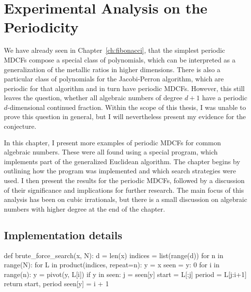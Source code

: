 \chapter{Experimental Analysis on the Periodicity}
\label{ch:implementation}

We have already seen in Chapter~\ref{ch:fibonacci},
that the simplest periodic MDCFs compose a special class of polynomials,
which can be interpreted as a generalization of the metallic ratios in higher
dimensions.
There is also a particular class of polynomials for the Jacobi-Perron algorithm,
which are periodic for that algorithm and in turn have periodic MDCFs.
However, this still leaves the question, whether all algebraic numbers of degree $d+1$
have a periodic $d$-dimensional continued fraction.
Within the scope of this thesis, I was unable to prove this question in
general, but I will nevertheless present my evidence for the conjecture.

In this chapter, I present more examples of periodic MDCFs for common algebraic numbers.
These were all found using a special program, which implements part of the generalized Euclidean algorithm.
The chapter begins by outlining how the program was implemented and which search strategies were used.
I then present the results for the periodic MDCFs, followed by a discussion of
their significance and implications for further research.
The main focus of this analysis has been on cubic irrationals,
but there is a small discussion on algebraic numbers with higher degree at the end of the chapter.

\section{Implementation details}

\begin{Python}[
    float=tbp,
    numbers=left,
    label={lst:bfs},
    caption={
      The implementation of the brute-force search for finding a periodic representation.
      The program iterates over all sequences with a maximum length of $N$
      until it finds a duplicate vector.
    }
  ]
def brute_force_search(x, N):
  d = len(x)
  indices = list(range(d))
  for n in range(N):
    for L in product(indices, repeat=n):
      y = x
      seen = {y: 0}
      for i in range(n):
        y = pivot(y, L[i])
        if y in seen:
          j = seen[y]
          start = L[:j]
          period = L[j:i+1]
          return start, period
        seen[y] = i + 1
\end{Python}

